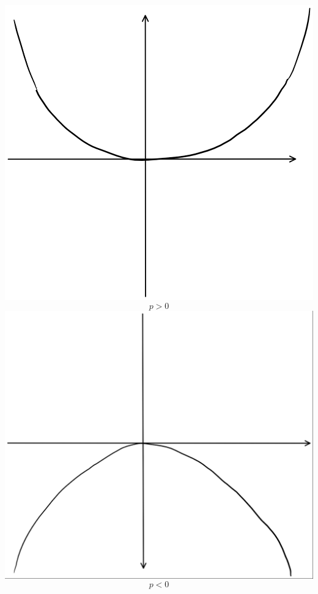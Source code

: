 \documentclass{scrbook}
\begin{document}
\begin{description}
\begin{description}
\includegraphics{Satz_15_2_4.png}\[p>0\]
\includegraphics{Satz_15_2_5.png}\[p<0\]


\end{description}
\end{description}
\end{document}
